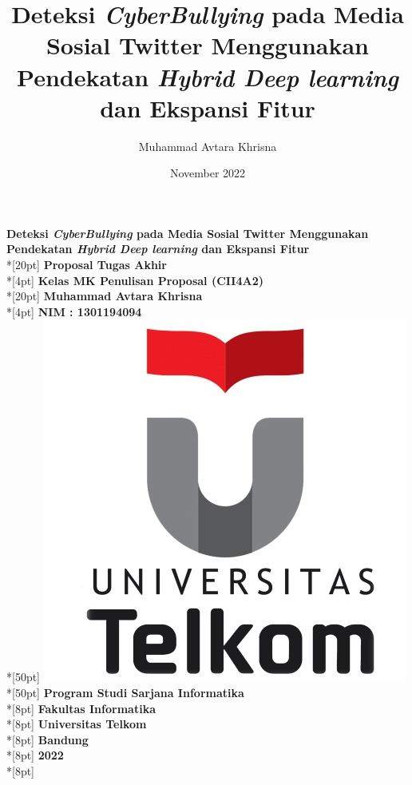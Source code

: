 \documentclass{thesis}
\title{Deteksi \textit{CyberBullying} pada Media Sosial Twitter Menggunakan Pendekatan \textit{Hybrid Deep learning} dan Ekspansi Fitur}
\author{Muhammad Avtara Khrisna}
\date{November 2022}
\begin{document}

\begin{titlepage}
    \begin{center}      
        \textbf{\Large Deteksi \textit{CyberBullying} pada Media Sosial Twitter Menggunakan Pendekatan \textit{Hybrid Deep learning} dan Ekspansi Fitur}\\*[20pt]
        \textbf{Proposal Tugas Akhir}\\*[4pt]
        \textbf{Kelas MK Penulisan Proposal (CII4A2)}\\*[20pt]
        \textbf{Muhammad Avtara Khrisna}\\*[4pt]
        \textbf{NIM : 1301194094}\\*[50pt]
        \includegraphics[scale=1]{images/logo.jpg}\\*[50pt]
        \textbf{\Large Program Studi Sarjana Informatika}\\*[8pt]
        \textbf{\Large Fakultas Informatika}\\*[8pt]
        \textbf{\Large Universitas Telkom}\\*[8pt]
        \textbf{\Large Bandung}\\*[8pt]
        \textbf{\Large 2022}\\*[8pt]
    \end{center}
\end{titlepage}

\pengesahan{}
\end{document}
